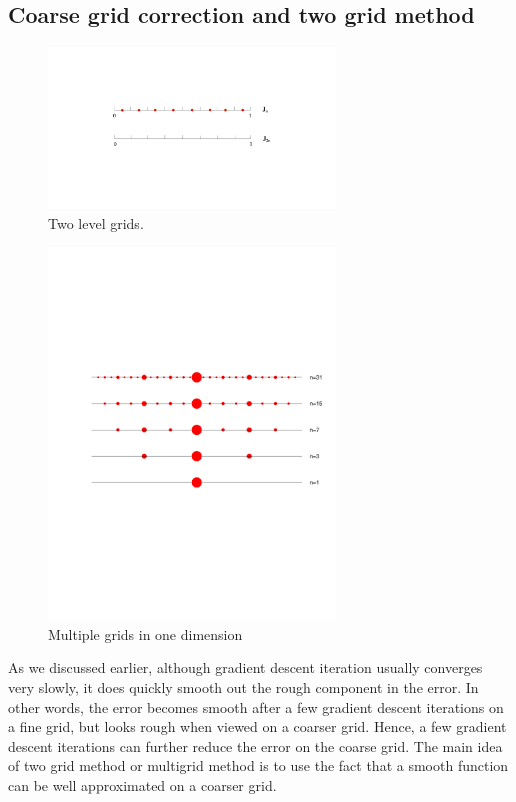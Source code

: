 \subsection{Coarse grid correction and two grid method}
\begin{figure}[hpt]
\begin{center}
\includegraphics*[width=3in]{figures/twogrid.pdf}
\caption{Two level grids.} 
\label{Interpolation}
\end{center}
\end{figure} 

\begin{figure}[!htb]
\begin{center}
\includegraphics[width=3in]{pictures/manygr.pdf}
\end{center}
\caption{Multiple grids in one dimension
\label{fig:manygrids}}
\end{figure}

As we discussed earlier, although gradient descent iteration usually
converges very slowly, it does quickly smooth out the rough 
component in the error. In other words, the error becomes smooth 
after a few gradient descent iterations on a fine grid, but looks 
rough when viewed on a coarser grid. Hence, a few gradient descent
iterations can further reduce the error on the coarse grid. 
The main idea of two grid method or multigrid method is 
to use the fact that a smooth function can be well 
approximated on a coarser grid.  

